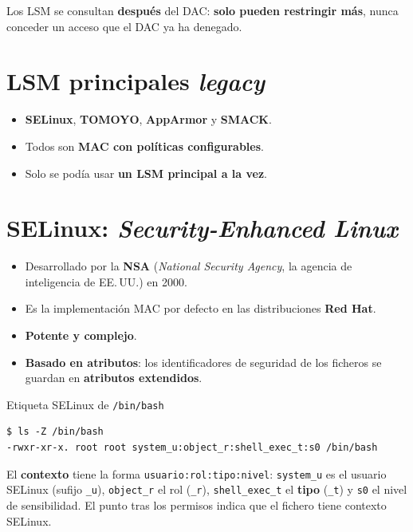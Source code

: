 \documentclass[11pt,a4paper]{report}
\begin{document}
\begin{importante}
Los LSM se consultan \textbf{después} del DAC: \textbf{solo pueden restringir más}, nunca conceder un acceso que el DAC ya ha denegado.
\end{importante}
 
\section{LSM principales \emph{legacy}}
 
\begin{itemize}
  \item \textbf{SELinux}, \textbf{TOMOYO}, \textbf{AppArmor} y \textbf{SMACK}.
  \item Todos son \textbf{MAC con políticas configurables}.
  \item Solo se podía usar \textbf{un LSM principal a la vez}.
\end{itemize}
 
\section{SELinux: \emph{Security-Enhanced Linux}}
 
\begin{itemize}
  \item Desarrollado por la \textbf{NSA} (\emph{National Security Agency}, la agencia de inteligencia de EE.\,UU.) en 2000.
  \item Es la implementación MAC por defecto en las distribuciones \textbf{Red Hat}.
  \item \textbf{Potente y complejo}.
  \item \textbf{Basado en atributos}: los identificadores de seguridad de los ficheros se guardan en \textbf{atributos extendidos}.
\end{itemize}
 
\begin{ejemplo}{Etiqueta SELinux de \texttt{/bin/bash}}
\begin{verbatim}
$ ls -Z /bin/bash
-rwxr-xr-x. root root system_u:object_r:shell_exec_t:s0 /bin/bash
\end{verbatim}
El \textbf{contexto} tiene la forma \texttt{usuario:rol:tipo:nivel}: \texttt{system\_u} es el usuario SELinux (sufijo \texttt{\_u}), \texttt{object\_r} el rol (\texttt{\_r}), \texttt{shell\_exec\_t} el \textbf{tipo} (\texttt{\_t}) y \texttt{s0} el nivel de sensibilidad. El punto tras los permisos indica que el fichero tiene contexto SELinux.
\end{ejemplo}
 
\end{document}
